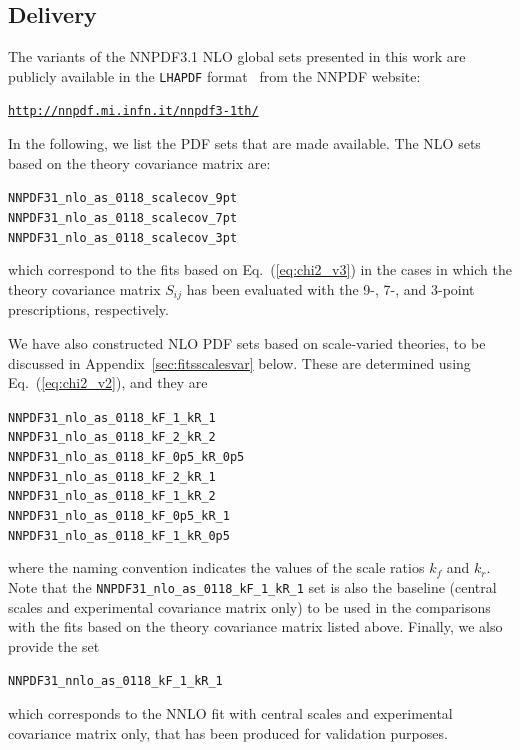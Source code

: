  
\subsection{Delivery}
\label{sec:delivery}

The variants of the NNPDF3.1 NLO global sets presented in this work are publicly available
in the {\tt LHAPDF} format~\cite{Buckley:2014ana} from the NNPDF website:

\begin{center}
 \href{http://nnpdf.mi.infn.it/nnpdf3-1th/}{\tt http://nnpdf.mi.infn.it/nnpdf3-1th/}
\end{center}

\noindent
In the following, we list the PDF sets that are made available.
%
The NLO sets based on the theory covariance matrix are: 
\begin{center}
  \tt NNPDF31\_nlo\_as\_0118\_scalecov\_9pt \\
  \tt NNPDF31\_nlo\_as\_0118\_scalecov\_7pt \\
  \tt NNPDF31\_nlo\_as\_0118\_scalecov\_3pt
\end{center}
which correspond to the fits based on Eq.~(\ref{eq:chi2_v3})
in the cases in which the theory covariance matrix $S_{ij}$ has been evaluated with
the 9-, 7-, and 3-point prescriptions, respectively.
%

We have also constructed NLO PDF sets based on 
scale-varied theories, to be discussed in
Appendix~\ref{sec:fitsscalesvar} below. These are  determined
using Eq.~(\ref{eq:chi2_v2}), and they are
\begin{center}
  \tt NNPDF31\_nlo\_as\_0118\_kF\_1\_kR\_1 \\
  \tt NNPDF31\_nlo\_as\_0118\_kF\_2\_kR\_2 \\
  \tt NNPDF31\_nlo\_as\_0118\_kF\_0p5\_kR\_0p5 \\
  \tt NNPDF31\_nlo\_as\_0118\_kF\_2\_kR\_1 \\
  \tt NNPDF31\_nlo\_as\_0118\_kF\_1\_kR\_2 \\
  \tt NNPDF31\_nlo\_as\_0118\_kF\_0p5\_kR\_1 \\
  \tt NNPDF31\_nlo\_as\_0118\_kF\_1\_kR\_0p5 
\end{center}
where the naming convention indicates the values of the scale ratios $k_f$ and $k_r$.
%
Note that the {\tt NNPDF31\_nlo\_as\_0118\_kF\_1\_kR\_1} set is also the baseline (central scales and
experimental covariance matrix only) to be used in the comparisons with the fits based
on the theory covariance matrix listed above.
%
Finally, we also provide the set
\begin{center}
  \tt NNPDF31\_nnlo\_as\_0118\_kF\_1\_kR\_1
\end{center}
which corresponds to the NNLO fit with central scales and
experimental covariance matrix only, that has been produced for validation purposes.

